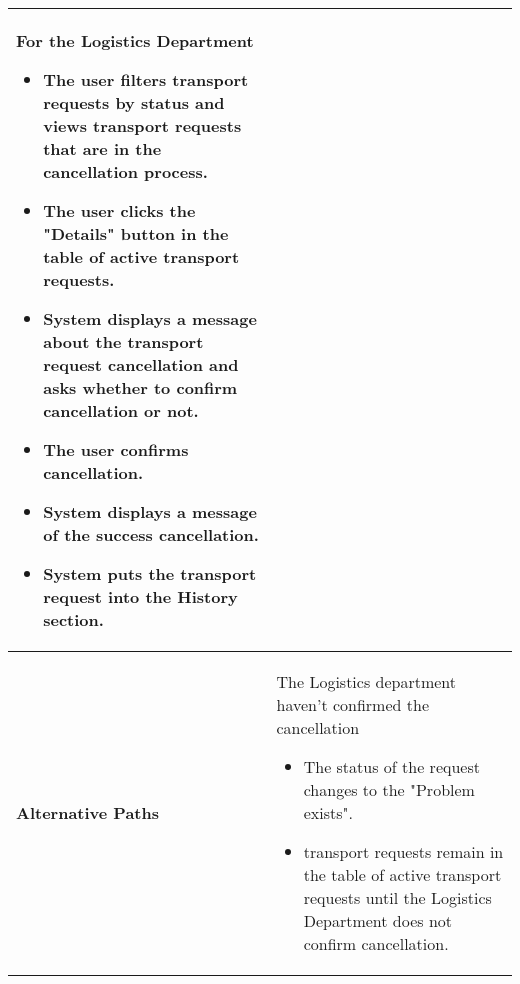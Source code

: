 \documentclass[a4paper]{article}
\begin{document}
\begin{longtable}{|p{}|p{}|}
\begin{itemize}
         \end{itemize} 
         \textbf{For the Logistics Department}
         \begin{itemize}
            \item The user filters transport requests by status and views transport requests that are in the cancellation process.
             \item The user clicks the "Details" button in the table of active transport requests.
             \item System displays a message about the transport request cancellation and asks whether to confirm cancellation or not.
             \item The user confirms cancellation.
             \item System displays a message of the success cancellation.
             \item System puts the transport request into the History section.
         \end{itemize} \\
         
      \hline
    \textbf{Alternative Paths} & The Logistics department haven't confirmed the cancellation
        \begin{itemize}
            \item The status of the request changes to the "Problem exists".
            \item transport requests remain in the table of active transport requests until the Logistics Department does not confirm cancellation.
        \end{itemize} \\
        \hline
    \end{longtable}
    
\end{document}
